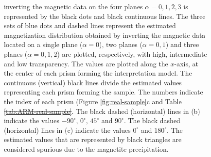 \documentclass[draft,gc]{agutex}
\providecommand{\DIFadd}[1]{{\protect\color{blue}\uwave{#1}}} %
\providecommand{\DIFdel}[1]{{\protect\color{red}\sout{#1}}}                      %
\providecommand{\DIFaddFL}[1]{\DIFadd{#1}} %
\providecommand{\DIFdelFL}[1]{\DIFdel{#1}} %
\providecommand{\DIFaddbeginFL}{} %
\providecommand{\DIFaddendFL}{} %
\providecommand{\DIFdelbeginFL}{} %
\providecommand{\DIFdelendFL}{} %
\begin{document}
\begin{figure}
{{ inverting the magnetic data on the four planes $\alpha = 0, 1, 2, 3$
 is represented
 by the black dots and black continuous lines. The three sets of
 blue dots and dashed lines represent the estimated 
 magnetization distribution obtained by inverting the 
 magnetic data located on a single plane ($\alpha = 0$),
 two planes ($\alpha = 0, 1$) and three planes ($\alpha = 0, 1, 2$)
 are plotted, respectively, with high, intermediate and low 
 transparency.
 The }\DIFaddendFL values are plotted along the $x$-axis, at the center of each 
 prism forming the interpretation model.
 The continuous (vertical) black lines divide the estimated values 
 representing each prism forming the sample.
 The numbers indicate the index of each prism 
 (Figure \ref{fig:real-sample}c and Table \DIFdelbeginFL \DIFdelFL{\ref{tab:ARM-real-sample}}\DIFdelendFL \DIFaddbeginFL \DIFaddFL{\ref{tab:IRM-real-sample}}\DIFaddendFL .
 The black dashed (horizontal) lines in (b) indicate the values 
 $-90^{\circ}$, $0^{\circ}$, $45^{\circ}$ and $90^{\circ}$.
 The black dashed (horizontal) lines in (c) indicate the values 
 $0^{\circ}$ and $180^{\circ}$.
 The estimated values that are represented by black triangles are
 considered spurious due to the magnetite precipitation.}
 \label{fig:estimate-real}
 \end{figure}

%

\clearpage
\end{document}
